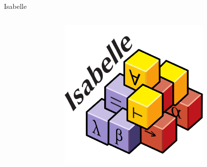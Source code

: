 \documentclass[17pt,aspectratio=169]{beamer}
\begin{document}
\begin{frame}{Isabelle}
\begin{columns}
\begin{column}{0.75\textwidth}
        \end{column}
        \begin{column}{0.25\textwidth}
            \begin{figure}
                \includegraphics[width=1.0\linewidth]{./images/isabelle_logo.png}
            \end{figure}
        \end{column}
    \end{columns}

\end{frame}
\end{document}

